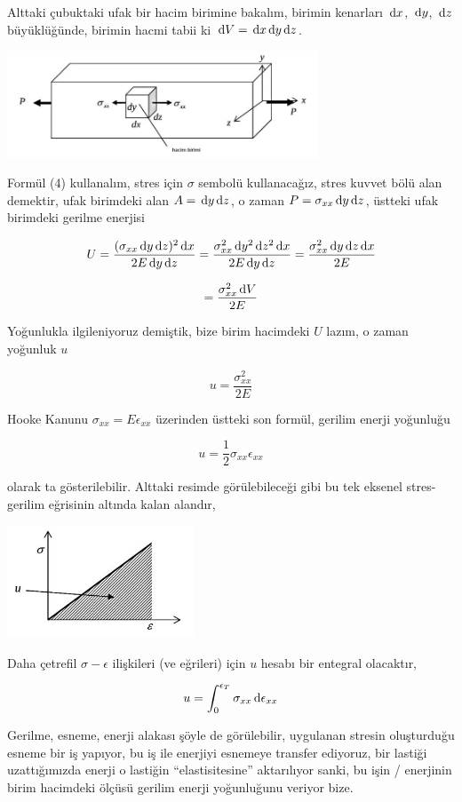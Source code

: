 \documentclass[12pt,fleqn]{article}\usepackage{../../common}
\begin{document}
Alttaki çubuktaki ufak bir hacim birimine bakalım, birimin kenarları $\,\mathrm{d} x$,
$\,\mathrm{d} y$, $\,\mathrm{d} z$ büyüklüğünde, birimin hacmi tabii ki $\,\mathrm{d} V = \,\mathrm{d} x \,\mathrm{d} y \,\mathrm{d}
z$.

\includegraphics[width=25em]{phy_020_strs_00_06.jpg}

Formül (4) kullanalım, stres için $\sigma$ sembolü kullanacağız, stres kuvvet
bölü alan demektir, ufak birimdeki alan $A = \,\mathrm{d} y \,\mathrm{d} z$, o zaman
$P = \sigma_{xx} \,\mathrm{d} y \,\mathrm{d} z$, üstteki ufak birimdeki gerilme enerjisi

$$
U = \frac{(\sigma_{xx} \,\mathrm{d} y \,\mathrm{d} z)^2 \,\mathrm{d} x}{2 E \,\mathrm{d} y \,\mathrm{d} z} =
\frac{\sigma_{xx}^2 \,\mathrm{d} y^2 \,\mathrm{d} z^2 \,\mathrm{d} x}{2 E \,\mathrm{d} y \,\mathrm{d} z} =
\frac{\sigma_{xx}^2 \,\mathrm{d} y \,\mathrm{d} z \,\mathrm{d} x}{2 E} 
$$

$$
= \frac{\sigma_{xx}^2 \,\mathrm{d} V}{2 E} 
$$

Yoğunlukla ilgileniyoruz demiştik, bize birim hacimdeki $U$ lazım, o zaman
yoğunluk $u$

$$
u = \frac{\sigma_{xx}^2}{2 E}
$$

Hooke Kanunu $\sigma_{xx} = E \epsilon_{xx}$ üzerinden üstteki son formül,
gerilim enerji yoğunluğu

$$
u = \frac{1}{2} \sigma_{xx} \epsilon_{xx}
$$

olarak ta gösterilebilir. Alttaki resimde görülebileceği gibi bu tek eksenel
stres-gerilim eğrisinin altında kalan alandır,

\includegraphics[width=15em]{phy_020_strs_00_09.jpg}

Daha çetrefil $\sigma-\epsilon$ ilişkileri (ve eğrileri) için $u$ hesabı
bir entegral olacaktır,

$$
u = \int _{0}^{\epsilon_{T}} \sigma_{xx} \,\mathrm{d} \epsilon_{xx} 
$$

Gerilme, esneme, enerji alakası şöyle de görülebilir, uygulanan stresin
oluşturduğu esneme bir iş yapıyor, bu iş ile enerjiyi esnemeye transfer
ediyoruz, bir lastiği uzattığımızda enerji o lastiğin ``elastisitesine''
aktarılıyor sanki, bu işin / enerjinin birim hacimdeki ölçüsü gerilim
enerji yoğunluğunu veriyor bize.
\end{document}
